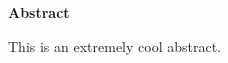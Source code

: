 \thispagestyle{plain}
\begin{center}
  \begin{Large}
    \textbf{Abstract}
  \end{Large}
  
    This is an extremely cool abstract.
\end{center}

